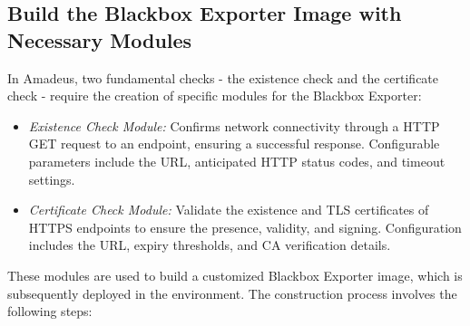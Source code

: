 \subsection{Build the Blackbox Exporter Image with Necessary Modules}

In Amadeus, two fundamental checks - the existence check and the certificate check - require the creation of specific modules for the Blackbox Exporter: 

\begin{itemize}
    \item \textit{Existence Check Module:} Confirms network connectivity through a \ac{HTTP} GET request to an endpoint, ensuring a successful response. Configurable parameters include the \ac{URL}, anticipated \ac{HTTP} status codes, and timeout settings. 
    \item \textit{Certificate Check Module:} Validate the existence and \ac{TLS} certificates of \ac{HTTPS} endpoints to ensure the presence, validity, and signing. Configuration includes the \ac{URL}, expiry thresholds, and \ac{CA} verification details. 
\end{itemize}

These modules are used to build a customized Blackbox Exporter image, which is subsequently deployed in the environment. The construction process involves the following steps: 

